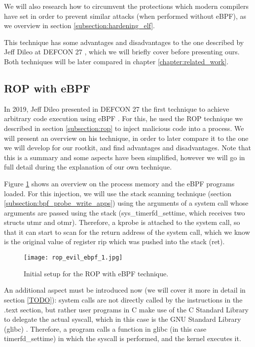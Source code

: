 We will also research how to circumvent the protections which modern compilers have set in order to prevent similar attacks (when performed without eBPF), as we overview in section \ref{subsection:hardening_elf}.

This technique has some advantages and disadvantages to the one described by Jeff Dileo at DEFCON 27 \cite{evil_ebpf_p6974}, which we will briefly cover before presenting ours. Both techniques will be later compared in chapter \ref{chapter:related_work}.


\subsection{ROP with eBPF} \label{subsection:rop_ebpf}
In 2019, Jeff Dileo presented in DEFCON 27 the first technique to achieve arbitrary code execution using eBPF \cite{evil_ebpf_p6974}. For this, he used the ROP technique we described in section \ref{subsection:rop} to inject malicious code into a process. We will present an overview on his technique, in order to later compare it to the one we will develop for our rootkit, and find advantages and disadvantages. Note that this is a summary and some aspects have been simplified, however we will go in full detail during the explanation of our own technique.

Figure \ref{fig:rop_evil_ebpf_1} shows an overview on the process memory and the eBPF programs loaded. For this injection, we will use the stack scanning technique (section \ref{subsection:bpf_probe_write_apps}) using the arguments of a system call whose arguments are passed using the stack (sys\_timerfd\_settime, which receives two structs utmr and otmr). Therefore, a kprobe is attached to the system call, so that it can start to scan for the return address of the system call, which we know is the original value of register rip which was pushed into the stack (ret).

\begin{figure}[htbp]
	\centering
	\texttt{[image: rop\_evil\_ebpf\_1.jpg]}
	\caption{Initial setup for the ROP with eBPF technique.}
	\label{fig:rop_evil_ebpf_1}
\end{figure}

An additional aspect must be introduced now (we will cover it more in detail in section \ref{TODO}): system calls are not directly called by the instructions in the .text section, but rather user programs in C make use of the C Standard Library to delegate the actual syscall, which in this case is the GNU Standard Library (glibc) \cite{glibc}. Therefore, a program calls a function in glibc (in this case timerfd\_settime) in which the syscall is performed, and the kernel executes it.

